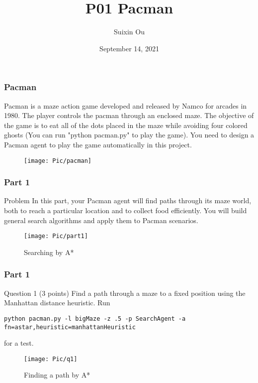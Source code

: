 \documentclass{beamer}
\title{P01 Pacman}
\author{Suixin Ou} %
\institute[SYSU] %
{
  School of Computer Science\\
  Sun Yat-sen University \\ %
  \medskip
}
\date{September 14, 2021} %
\begin{document}
\begin{frame}
  \titlepage
\end{frame}

\begin{frame}
  \frametitle{Pacman}
    Pacman is a maze action game developed and released by Namco for arcades in 1980. The player controls the pacman through an enclosed maze. The objective of the game is to eat all of the dots placed in the maze while avoiding four colored ghosts (You can run "python pacman.py" to play the game). You need to design a Pacman agent to play the game automatically in this project.
    \begin{figure}[ht]
      \centering
      \texttt{[image: Pic/pacman]}
    \end{figure}
\end{frame}

\begin{frame}
  \frametitle{Part 1}
  \begin{block}{Problem}
    In this part, your Pacman agent will find paths through its maze world, both to reach a particular location and to collect food efficiently. You will build general search algorithms and apply them to Pacman scenarios.
    \begin{figure}[ht]
      \centering
      \texttt{[image: Pic/part1]}
      \caption{Searching by A*}
    \end{figure}
  \end{block}
\end{frame}

\begin{frame}
  \frametitle{Part 1}
  \begin{block}{Question 1 (3 points)}
    Find a path through a maze to a fixed position using the Manhattan distance heuristic. Run \begin{scriptsize}\texttt{python pacman.py -l bigMaze -z .5 -p SearchAgent -a fn=astar,heuristic=manhattanHeuristic}\end{scriptsize} for a test.
    \begin{figure}[ht]
      \centering
      \texttt{[image: Pic/q1]}
      \caption{Finding a path by A*}
    \end{figure}
  \end{block}
\end{frame}
\end{document}
